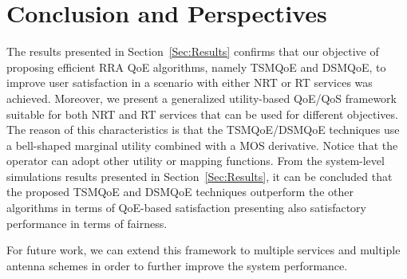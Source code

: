 \documentclass[conference]{IEEEtran}
\newcommand{\FigRef}[1]{Figure~\ref{#1}}
\newcommand{\SecRef}[1]{Section~\ref{#1}}
\begin{document}


\section{Conclusion and Perspectives}
\label{Sec:conclusion}
The results presented in \SecRef{Sec:Results} confirms that our objective of proposing efficient \ac{RRA} QoE algorithms, namely TSMQoE and DSMQoE, to improve user satisfaction in a scenario with either NRT or RT services was achieved. Moreover, we present a generalized utility-based QoE/QoS framework suitable for both NRT and RT services that can be used  for different objectives. The reason of this characteristics is that the TSMQoE/DSMQoE techniques use a bell-shaped marginal utility combined with a MOS derivative. Notice that the operator can adopt other utility or mapping functions.
From the system-level simulations results presented in \SecRef{Sec:Results}, it can be concluded that the proposed TSMQoE and DSMQoE techniques outperform the other algorithms in terms of QoE-based satisfaction presenting also satisfactory performance in terms of fairness.

For future work, we can extend this framework to multiple services and multiple antenna schemes in order to further improve the system performance.
\end{document}
